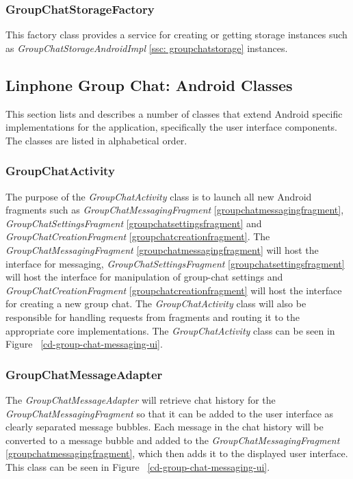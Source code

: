 \documentclass[11pt]{article}
\begin{document}
\subsubsection{GroupChatStorageFactory}\label{ssc: groupchatstoragefactory}
This factory class provides a service for creating or getting storage instances such as \textit{GroupChatStorageAndroidImpl} \ref{ssc: groupchatstorage} instances.




\subsection{Linphone Group Chat: Android Classes}\label{subsec: androidclasses}
This section lists and describes a number of classes that extend Android specific implementations for the application, specifically the user interface components. The classes are listed in alphabetical order.
\subsubsection{GroupChatActivity}\label{ssc: groupchatactivity}
The purpose of the \textit{GroupChatActivity} class is to launch all new Android fragments such as \textit{GroupChatMessagingFragment} \ref{groupchatmessagingfragment}, \textit{GroupChatSettingsFragment} \ref{groupchatsettingsfragment} and \textit{GroupChatCreationFragment} \ref{groupchatcreationfragment}. The \textit{GroupChatMessagingFragment} \ref{groupchatmessagingfragment} will host the interface for messaging, \textit{GroupChatSettingsFragment} \ref{groupchatsettingsfragment} will host the interface for manipulation of group-chat settings and \textit{GroupChatCreationFragment} \ref{groupchatcreationfragment} will host the interface for creating a new group chat. The \textit{GroupChatActivity} class will also be responsible for handling requests from fragments and routing it to the appropriate core implementations. The \textit{GroupChatActivity} class can be seen in Figure ~\ref{cd-group-chat-messaging-ui}.
\subsubsection{GroupChatMessageAdapter}\label{groupchatmessageadapter}
The \textit{GroupChatMessageAdapter} will retrieve chat history for the \textit{GroupChatMessagingFragment} so that it can be added to the user interface as clearly separated message bubbles. Each message in the chat history will be converted to a message bubble and added to the \textit{GroupChatMessagingFragment} \ref{groupchatmessagingfragment}, which then adds it to the displayed user interface. This class can be seen in Figure ~\ref{cd-group-chat-messaging-ui}.
\end{document}
